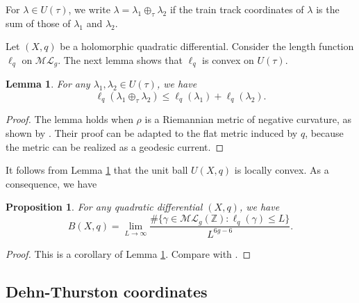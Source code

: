 \documentclass{amsart}
\theoremstyle{plain}
\newtheorem{lemma}[theorem]{Lemma}
\newtheorem{proposition}[theorem]{Proposition}
\theoremstyle{definition}
\numberwithin{equation}{section}
\newcommand{\ML}{\mathcal{ML}_g}
\begin{document}
 

For $\lambda\in U(\tau)$, we write $\lambda = \lambda_1\oplus_\tau \lambda_2$
if the train track coordinates of $\lambda$ is the sum of those of $\lambda_1$ and $\lambda_2$. 

Let $(X,q)$ be a holomorphic quadratic differential. Consider the length function $\ell_q$ on $\ML$.
The next lemma shows that $\ell_q$ is convex on $U(\tau)$. 

\begin{lemma}\label{lem:convex}  
For any $\lambda_1, \lambda_2\in U(\tau)$, we have 
$$\ell_q(\lambda_1\oplus_\tau \lambda_2) \leq \ell_q(\lambda_1)+ \ell_q(\lambda_2).$$
\end{lemma}
\begin{proof}
The lemma holds when $\rho$ is a Riemannian metric of negative curvature,
as shown by \cite[Theorem 5.1]{EskinAlex2022Ecos}. 
Their proof can be adapted to the flat metric induced by $q$,
because the metric can be realized as a geodesic current.
\end{proof}

It follows from Lemma \ref{lem:convex} that the unit ball $U(X,q)$ is locally convex. As a consequence, we have 

\begin{proposition}\label{lem:limit}
  For any quadratic differential $(X,q)$, we have 
  $$B(X,q)=\lim_{L\to\infty} \frac{\# \{\gamma \in \ML(\mathbb{Z}) : \ell_q(\gamma) \leq L\}}{L^{6g-6}}.$$
\end{proposition}
\begin{proof}
  This is a corollary of Lemma \ref{lem:convex}.
Compare with \cite[Proposition 3.1]{Mir2008}.
\end{proof}





\subsection{Dehn-Thurston coordinates}
\end{document}
